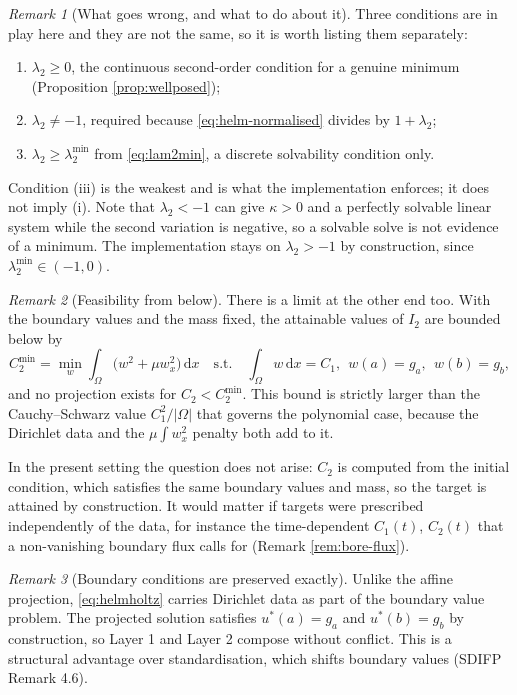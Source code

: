 \documentclass[11pt,a4paper]{article}
\theoremstyle{remark}
\newtheorem{remark}{Remark}
\newcommand{\dx}{\,\mathrm{d}x}
\newcommand{\us}{u^{*}}
\newcommand{\Om}{\Omega}
\begin{document}
\begin{remark}[What goes wrong, and what to do about it]
Three conditions are in play here and they are not the same, so it is worth
listing them separately:
\begin{enumerate}[label=(\roman*), leftmargin=2.2em]
\item $\lambda_2 \geq 0$, the continuous second-order condition for a genuine
      minimum (Proposition \ref{prop:wellposed});
\item $\lambda_2 \neq -1$, required because \eqref{eq:helm-normalised} divides
      by $1+\lambda_2$;
\item $\lambda_2 \geq \lambda_2^{\min}$ from \eqref{eq:lam2min}, a discrete
      solvability condition only.
\end{enumerate}
Condition (iii) is the weakest and is what the implementation enforces; it does
not imply (i). Note that $\lambda_2 < -1$ can give $\kappa > 0$ and a perfectly
solvable linear system while the second variation is negative, so a solvable
solve is not evidence of a minimum. The implementation stays on $\lambda_2 > -1$
by construction, since $\lambda_2^{\min} \in (-1,0)$.
\end{remark}

\begin{remark}[Feasibility from below]
There is a limit at the other end too. With the boundary values and the mass
fixed, the attainable values of $I_2$ are bounded below by
\begin{equation}
C_2^{\min}
= \min_{w}\int_\Om\big(w^2+\mu w_x^2\big)\dx
\quad\text{s.t.}\quad
\int_\Om w\dx = C_1,\ \ w(a)=g_a,\ \ w(b)=g_b ,
\end{equation}
and no projection exists for $C_2 < C_2^{\min}$. This bound is strictly larger
than the Cauchy--Schwarz value $C_1^2/|\Om|$ that governs the polynomial case,
because the Dirichlet data and the $\mu\int w_x^2$ penalty both add to it.

In the present setting the question does not arise: $C_2$ is computed from the
initial condition, which satisfies the same boundary values and mass, so the
target is attained by construction. It would matter if targets were prescribed
independently of the data, for instance the time-dependent $C_1(t)$, $C_2(t)$
that a non-vanishing boundary flux calls for (Remark \ref{rem:bore-flux}).
\end{remark}

\begin{remark}[Boundary conditions are preserved exactly]
Unlike the affine projection, \eqref{eq:helmholtz} carries Dirichlet data as part
of the boundary value problem. The projected solution satisfies
$\us(a)=g_a$ and $\us(b)=g_b$ by construction, so Layer 1 and Layer 2 compose
without conflict. This is a structural advantage over standardisation, which
shifts boundary values (SDIFP Remark 4.6).
\end{remark}
\end{document}
